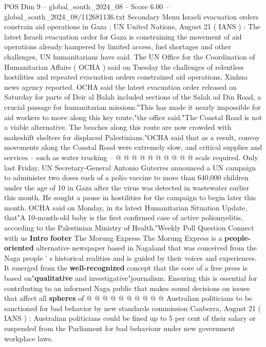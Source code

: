 \begin{textsample}{POS Dim 9 – global\_south\_2024\_08 – Score 6.00 – global\_south\_2024\_08/112681136.txt}  \label{ex:f9_pos_111}
Secondary Menu Israeli evacuation orders constrain aid operations in Gaza : UN United Nations, August 21 ( IANS ) : The latest Israeli evacuation order for Gaza is constraining the movement of aid operations already hampered by limited access, fuel shortages and other challenges, UN humanitarians have said.
The UN Office for the Coordination of Humanitarian Affairs ( OCHA ) said on Tuesday the challenges of relentless hostilities and repeated evacuation orders constrained aid operations, Xinhua news agency reported.
OCHA said the latest evacuation order released on Saturday for parts of Deir al Balah included sections of the Salah ad Din Road, a crucial passage for humanitarian missions."This has made it nearly impossible for aid workers to move along this key route,"the office said."The Coastal Road is not a viable alternative.
The beaches along this route are now crowded with makeshift shelters for displaced Palestinians."OCHA said that as a result, convoy movements along the Coastal Road were extremely slow, and critical supplies and services -- such as water trucking -- @ @ @ @ @ @ @ @ @ @ scale required.
Only last Friday, UN Secretary-General Antonio Guterres announced a UN campaign to administer two doses each of a polio vaccine to more than 640,000 children under the age of 10 in Gaza after the virus was detected in wastewater earlier this month.
He sought a pause in hostilities for the campaign to begin later this month.
OCHA said on Monday, in its latest Humanitarian Situation Update, that"A 10-month-old baby is the first confirmed case of active poliomyelitis, according to the Palestinian Ministry of Health."Weekly Poll Question Connect with us \textbf{Intro} \textbf{footer} The Morung Express The Morung Express is a \textbf{people-oriented} alternative newspaper based in Nagaland that was conceived from the Naga people ' s historical realities and is guided by their voices and experiences.
It emerged from the \textbf{well-recognized} concept that the core of a free press is based on"\textbf{qualitative} and investigative"journalism.
Ensuring this is essential for contributing to an informed Naga public that makes sound decisions on issues that affect all \textbf{spheres} of @ @ @ @ @ @ @ @ @ @ Australian politicians to be sanctioned for bad behavior by new standards commission Canberra, August 21 ( IANS ) : Australian politicians could be fined up to 5 per cent of their salary or suspended from the Parliament for bad behaviour under new government workplace laws.

\end{textsample}
